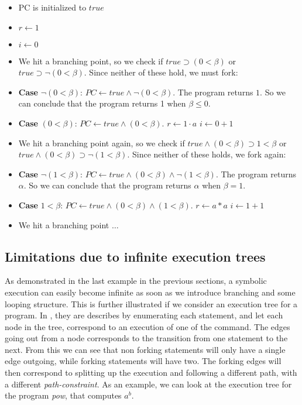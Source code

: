 		\begin{itemize}
			\item PC is initialized to $true$
			\item $r \gets 1$
			\item $i \gets 0$
			\item We hit a branching point, so we check if $true \supset (0 < \beta)$ or $true \supset \neg (0 < \beta)$. Since neither of these hold, we must fork:
			\item \textbf{Case} $ \neg (0 < \beta) $: $PC \gets true \land \neg (0 < \beta) $.
				The program returns $1$. So we can conclude that the program returns 1 when $\beta \leq 0$.
			\item \textbf{Case} $ (0 < \beta)$: $PC \gets true \land (0 < \beta)$.
			\subitem  $ r \gets 1 \cdot a$
			\subitem  $ i \gets 0 + 1$
			\item We hit a branching point again, so we check if $true \land (0 < \beta) \supset 1 < \beta$ or $true \land (0 < \beta) \supset \neg (1 < \beta)$. Since neither of these holds, we fork again:
			\item \textbf{Case} $ \neg(1 < \beta)$: $PC \gets true \land (0 < \beta) \land \neg (1 < \beta)$. The program returns $\alpha$. So we can conclude that the program returns $\alpha$ when $ \beta = 1$.
			\item \textbf{Case} $ 1 < \beta$: $PC \gets true \land (0 < \beta) \land (1 < \beta)$.
			\subitem $r \gets a*a$
			\subitem $i \gets 1 + 1$
			\item We hit a branching point $\ldots$	
		\end{itemize}
		
		\subsection{Limitations due to infinite execution trees}
			As demonstrated in the last example in the previous sections, a symbolic execution can easily become infinite as soon as we introduce branching and some looping structure. This is further illustrated if we consider an execution tree for a program. In \cite{king76}, they are describes by enumerating each statement, and let each node in the tree, correspond to an execution of one of the command. The edges going out from a node corresponds to the transition from one statement to the next. From this we can see that non forking statements will only have a single edge outgoing, while forking statements will have two. The forking edges will then correspond to splitting up the execution and following a different path, with a different \emph{path-constraint}. As an example, we can look at the execution tree for the program \emph{pow}, that computes $a^b$. 
			
